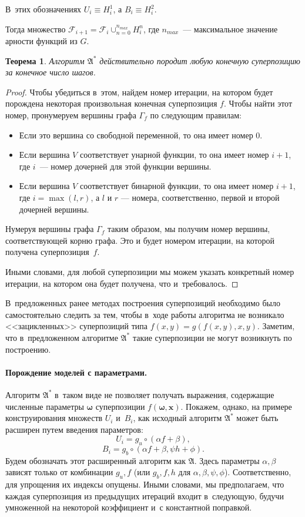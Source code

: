 \documentclass[12pt,a4paper]{article}
\newtheorem{theorem}{Теорема}
\begin{document}
В~этих обозначениях $U_i \equiv H_i^1$, а $B_i \equiv H_i^2$.

Тогда множество $\mathcal{F}_{i+1} = \mathcal{F}_i \cup_{n=0}^{n_{max}} H_i^n$,
где $n_{max}$~--- максимальное значение арности функций из $G$.

\begin{theorem}
  Алгоритм $\mathfrak{A^*}$ действительно породит любую конечную суперпозицию
  за конечное число шагов.
\end{theorem}
\begin{proof}
  Чтобы убедиться в~этом, найдем номер итерации, на котором будет порождена
  некоторая произвольная конечная суперпозиция $f$. Чтобы найти этот номер,
  пронумеруем вершины графа $\Gamma_f$ по следующим правилам:
  \begin{itemize}
	\item Если это вершина со свободной переменной, то она имеет номер $0$.
	\item Если вершина $V$ соответствует унарной функции, то она имеет номер
	  $i+1$, где $i$~--- номер дочерней для этой функции вершины.
	\item Если вершина $V$ соответствует бинарной функции, то она имеет номер
	  $i+1$, где $i = \max (l, r)$, а $l$ и $r$ --- номера, соответственно,
	  первой и второй дочерней вершины.
  \end{itemize}

  Нумеруя вершины графа $\Gamma_f$ таким образом, мы получим номер вершины,
  соответствующей корню графа. Это и будет номером итерации, на которой получена
  суперпозиция~$f$.
  
  Иными словами, для любой суперпозиции мы можем указать конкретный номер
  итерации, на котором она будет получена, что и~требовалось.
\end{proof}

В~предложенных ранее методах построения суперпозиций \cite{Zelinka2008}
необходимо было самостоятельно следить за тем, чтобы в~ходе работы алгоритма
не возникало <<зацикленных>> суперпозиций типа $f(x, y) = g (f(x, y), x, y)$.
Заметим, что в~предложенном алгоритме $\mathfrak{A^*}$ такие суперпозиции
не могут возникнуть по построению.

\paragraph{Порождение моделей с параметрами.}
Алгоритм $\mathfrak{A^*}$ в~таком виде не позволяет получать выражения, содержащие численные
параметры $\boldsymbol{\omega}$ суперпозиции $f(\boldsymbol{\omega}, \mathbf{x})$.
Покажем, однако, на примере конструирования множеств $U_i$ и~$B_i$, как
исходный алгоритм $\mathfrak{A^*}$ может быть расширен путем введения параметров:
\[
U_i = { g_u \circ (\alpha f + \beta) },
\]
\[
B_i = { g_b \circ (\alpha f + \beta, \psi h + \phi) }.
\]
Будем обозначать этот расширенный алгоритм как $\mathfrak{A}$. Здесь параметры
$\alpha, \beta$ зависят только от комбинации $g_u, f$ (или $g_b, f, h$ для
$\alpha, \beta, \psi, \phi$). Соответственно, для упрощения их индексы опущены.
Иными словами, мы предполагаем, что каждая суперпозиция из предыдущих итераций
входит в~следующую, будучи умноженной на некоторой коэффициент и~с константной
поправкой.
\end{document}
